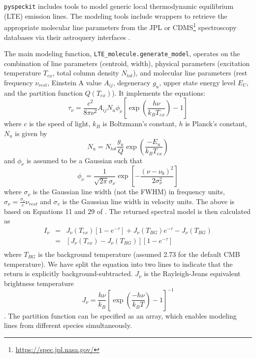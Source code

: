 \documentclass[twocolumn]{aastex63}
\newcommand{\pyspeckit}{\texttt{pyspeckit}\xspace}
\begin{document}
\pyspeckit includes tools to model generic local thermodynamic equilibrium (LTE) emission lines.
The modeling tools include wrappers to retrieve the appropriate molecular line parameters from the JPL \citep{Pickett1998} or CDMS\footnote{\url{https://spec.jpl.nasa.gov/}} \citep{Muller2005} spectroscopy databases via their astroquery interfaces \citep{Ginsburg2019}.

The main modeling function, \texttt{LTE\_molecule.generate\_model}, operates on the combination of line parameters (centroid, width), physical parameters (excitation temperature $T_{ex}$, total column density $N_{tot}$), and molecular line parameters (rest frequency $\nu_{rest}$, Einstein A value $A_{ij}$, degeneracy $g_u$, upper state energy level $E_U$, and the partition function $Q(T_{ex})$).
It implements the equations:
\begin{equation}
            \tau_\nu = \frac{c^2}{8 \pi \nu^2} A_{ij} N_u \phi_\nu
                    \left[ \exp\left( \frac{h \nu}{k_B T_{ex}} \right)  - 1 \right]
\end{equation}
where $c$ is the speed of light, $k_B$ is Boltzmann's constant, $h$ is Planck's constant, $N_u$ is given by
\begin{equation}
        N_{u} = N_{tot} \frac{g_u}{Q} \exp\left(\frac{-E_u}{k_B T_{ex}} \right)
\end{equation}
and $\phi_\nu$ is assumed to be a Gaussian such that
\begin{equation}
        \phi_\nu = \frac{1}{\sqrt{2 \pi} \sigma_\nu}
        \exp \left[ -\frac{(\nu-\nu_0)^2}{2 \sigma_\nu^2} \right]
\end{equation}
where $\sigma_\nu$ is the Gaussian line width (not the FWHM) in frequency units, $\sigma_\nu = \frac{\sigma_v}{c} \nu_{rest}$ and $\sigma_v$ is the Gaussian line width in velocity units.
The above is based on Equations 11 and 29 of \citet{Mangum2015}.
The returned spectral model is then calculated as 
\begin{equation}
    \begin{array}{lll}
    I_\nu & = & J_\nu(T_{ex}) \left[1 - e^{-\tau}\right] + J_\nu(T_{BG}) e^{-\tau}  - J_\nu(T_{BG})  \\
          & = & \left[J_\nu(T_{ex})-J_\nu(T_{BG})\right] \left[1 - e^{-\tau}\right] \\
    \end{array}
\end{equation}
where $T_{BG}$ is the background temperature (assumed 2.73 for the default CMB temperature).
We have split the equation into two lines to indicate that the return is explicitly background-subtracted.
$J_\nu$ is the Rayleigh-Jeans equivalent brightness temperature
\begin{equation}
    J_\nu = \frac{h \nu}{k_B} \left[\exp\left(\frac{-h \nu }{k_B T}\right) -1 \right]^{-1}
\end{equation}.
The partition function can be specified as an array, which enables modeling lines from different species simultaneously.
\end{document}
